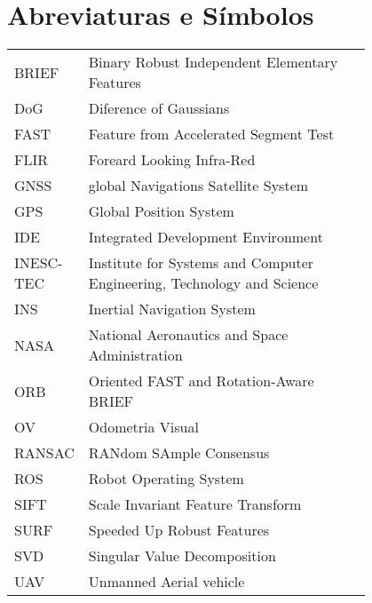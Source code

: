 \chapter*{Abreviaturas e Símbolos}

\begin{flushleft}
\begin{tabular}{l p{0.8\linewidth}}

		BRIEF & Binary Robust Independent Elementary Features\\
	
	
	
	DoG & Diference of Gaussians\\
	
	
	
	FAST & Feature from Accelerated Segment Test\\
	FLIR & Foreard Looking Infra-Red\\
	
	GNSS & global Navigations Satellite System \\\textbf{}
	GPS & Global Position System\\
	

	

	IDE & Integrated Development Environment \\
	INESC-TEC & Institute for Systems and Computer
		Engineering, Technology and Science \\
	INS &  Inertial Navigation System\\

	NASA & National Aeronautics and Space Administration\\

	ORB & Oriented FAST and Rotation-Aware BRIEF\\
	
	OV & Odometria Visual\\
	
	RANSAC & RANdom SAmple Consensus\\
	ROS & Robot Operating System \\

	SIFT & Scale Invariant Feature Transform\\
	SURF & Speeded Up Robust Features\\	
	SVD & Singular Value Decomposition\\


	UAV & Unmanned Aerial vehicle \\






\end{tabular}
\end{flushleft}

